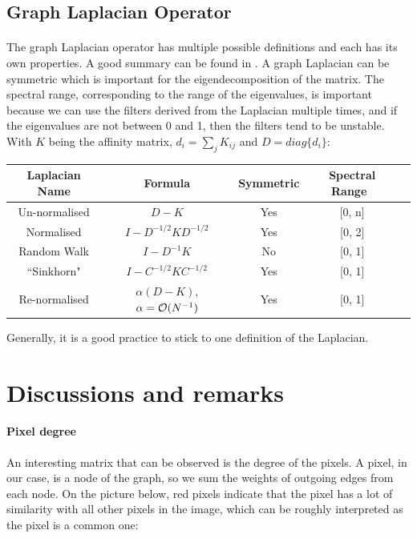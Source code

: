 \subsection{Graph Laplacian Operator}
\label{subsec:laplacian-variations}

\paragraph{}
The graph Laplacian operator has multiple possible definitions and each has its own properties.
A good summary can be found in \cite{siam_slides_2016}.
A graph Laplacian can be symmetric which is important for the eigendecomposition of the matrix.
The spectral range, corresponding to the range of the eigenvalues, is important because we can use the filters derived from the Laplacian multiple times, and if the eigenvalues are not between 0 and 1, then the filters tend to be unstable.
With \(K\) being the affinity matrix, \(d_i = \sum_j K_{ij}\) and \(D = diag\{d_i\}\):

\begin{table}[!htbp]
 \centering
 \begin{tabular}{|c|c|c|c|c|}
  \hline
  Laplacian Name & Formula & Symmetric & Spectral Range \\
  \hline
  Un-normalised & \(D - K\) & Yes & [0, n] \\
  \hline
  Normalised & \(I - D^{-1/2}KD^{-1/2}\) & Yes & [0, 2] \\
  \hline
  Random Walk & \(I - D^{-1}K\) & No & [0, 1] \\
  \hline
  ``Sinkhorn" \cite{milanfar_symmetrizing_2013} & \(I - C^{-1/2}KC^{-1/2}\) & Yes & [0, 1] \\
  \hline
  Re-normalised \cite{milanfar_new_2016} & \(\alpha(D - K)\), \(\alpha = \operatorname{\mathcal{O}}(N^{-1})\) & Yes & [0, 1] \\
  \hline
 \end{tabular}
\end{table}
Generally, it is a good practice to stick to one definition of the Laplacian.

\section{Discussions and remarks}

\paragraph{Pixel degree}
An interesting matrix that can be observed is the degree of the pixels.
A pixel, in our case, is a node of the graph, so we sum the weights of outgoing edges from each node.
On the picture below, red pixels indicate that the pixel has a lot of similarity with all other pixels in the image, which can be roughly interpreted as the pixel is a common one:

